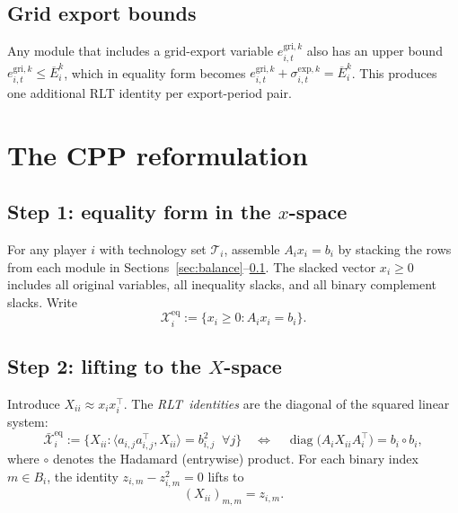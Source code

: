 \documentclass[11pt]{article}
\theoremstyle{definition}
\newcommand{\inner}[2]{\langle #1, #2 \rangle}
\newcommand{\diag}{\operatorname{diag}}
\newcommand{\feaseq}{\mathcal{X}^{\mathrm{eq}}}
\newcommand{\feasbar}{\bar{\mathcal{X}}^{\mathrm{eq}}}
\newcommand{\Tech}{\mathcal{T}}
\begin{document}
\subsection{Grid export bounds}
\label{sec:grid-export}

Any module that includes a grid-export variable $e^{\mathrm{gri},k}_{i,t}$
also has an upper bound
$e^{\mathrm{gri},k}_{i,t}\le\overline{E}^{k}_i$,
which in equality form becomes
$e^{\mathrm{gri},k}_{i,t}+\sigma^{\mathrm{exp},k}_{i,t}
=\overline{E}^{k}_i$.  This produces one additional RLT identity per
export-period pair.

\section{The CPP reformulation}
\label{sec:cpp}

\subsection{Step 1: equality form in the $x$-space}

For any player $i$ with technology set $\Tech_i$, assemble $A_ix_i=b_i$
by stacking the rows from each module in Sections~\ref{sec:balance}--\ref{sec:grid-export}.
The slacked vector $x_i\ge0$ includes all original variables, all inequality
slacks, and all binary complement slacks.  Write
\begin{equation}
\feaseq_i:=\{x_i\ge0:A_ix_i=b_i\}.
\label{eq:feaseq}
\end{equation}

\subsection{Step 2: lifting to the $X$-space}
\label{sec:lifting}

Introduce $X_{ii}\approx x_ix_i^{\top}$.  The
\emph{RLT~identities} are the diagonal of the squared linear system:
\begin{equation}
\feasbar_i:=\bigl\{X_{ii}:\inner{a_{i,j}a_{i,j}^{\top}}{X_{ii}}
  =b_{i,j}^{2}\;\;\forall j\bigr\}
\quad\Longleftrightarrow\quad
\diag\!\bigl(A_iX_{ii}A_i^{\top}\bigr)=b_i\circ b_i,
\label{eq:rlt}
\end{equation}
where $\circ$ denotes the Hadamard (entrywise) product.  For each
binary index $m\in B_i$, the identity $z_{i,m}-z_{i,m}^{2}=0$ lifts to
\begin{equation}
(X_{ii})_{m,m}=z_{i,m}.
\label{eq:bindiag}
\end{equation}
\end{document}
